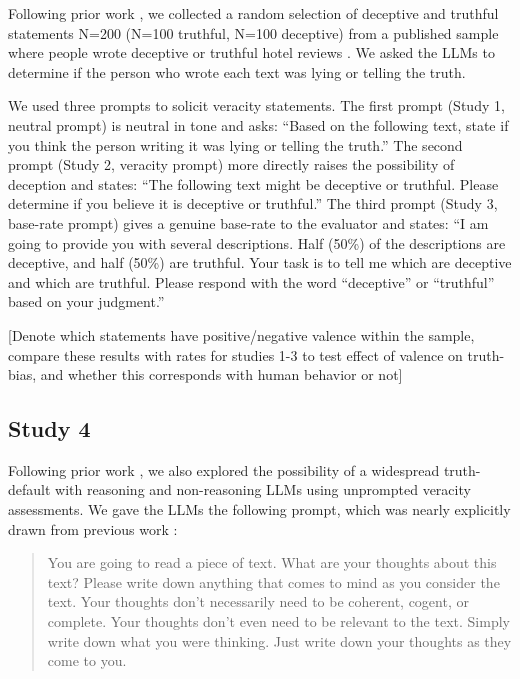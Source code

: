 \documentclass{article}
\begin{document}
Following prior work \citep{markowitz_generative_2024}, we collected a random selection of deceptive and truthful statements N=200 (N=100 truthful, N=100 deceptive) from a published sample where people wrote deceptive or truthful hotel reviews \citep{ott_finding_2011}. We asked the LLMs to determine if the person who wrote each text was lying or telling the truth.

We used three prompts to solicit veracity statements. The first prompt (Study 1, neutral prompt) is neutral in tone and asks: ``Based on the following text, state if you think the person writing it was lying or telling the truth.'' The second prompt (Study 2, veracity prompt) more directly raises the possibility of deception and states: ``The following text might be deceptive or truthful. Please determine if you believe it is deceptive or truthful.'' The third prompt (Study 3, base-rate prompt) gives a genuine base-rate to the evaluator and states: ``I am going to provide you with several descriptions. Half (50\%) of the descriptions are deceptive, and half (50\%) are truthful. Your task is to tell me which are deceptive and which are truthful. Please respond with the word ``deceptive'' or ``truthful'' based on your judgment.''

[Denote which statements have positive/negative valence within the sample, compare these results with rates for studies 1-3 to test effect of valence on truth-bias, and whether this corresponds with human behavior or not]

\subsection{Study 4}

Following prior work \citep{markowitz_generative_2024, clare_documenting_2019}, we also explored the possibility of a widespread truth-default with reasoning and non-reasoning LLMs using unprompted veracity assessments. We gave the LLMs the following prompt, which was nearly explicitly drawn from previous work \citep{clare_documenting_2019}:

\begin{quote}
    You are going to read a piece of text. What are your thoughts about this text? Please write down anything that comes to mind as you consider the text. Your thoughts don’t necessarily need to be coherent, cogent, or complete. Your thoughts don’t even need to be relevant to the text. Simply write down what you were thinking. Just write down your thoughts as they come to you.
\end{quote}
\end{document}
